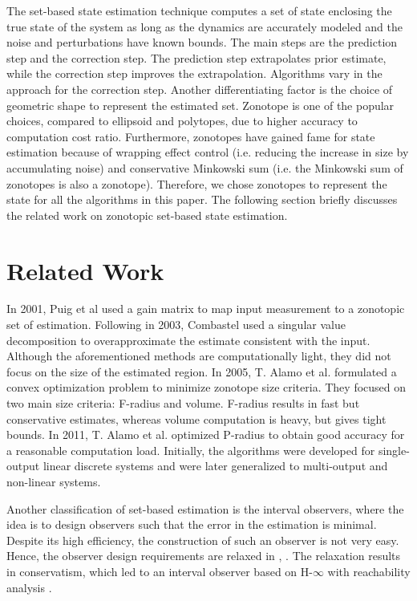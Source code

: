 The set-based state estimation technique computes a set of state enclosing the true state of the system as long as the dynamics are accurately modeled and the noise and perturbations have known bounds. The main steps are the prediction step and the correction step. The prediction step extrapolates prior estimate, while the correction step improves the extrapolation. Algorithms vary in the approach for the correction step. Another differentiating factor is the choice of geometric shape to represent the estimated set. Zonotope is one of the popular choices, compared to ellipsoid and polytopes, due to higher accuracy to computation cost ratio. Furthermore, zonotopes have gained fame for state estimation because of wrapping effect control (i.e. reducing the increase in size by accumulating noise) and conservative Minkowski sum (i.e. the Minkowski sum of zonotopes is also a zonotope). Therefore, we chose zonotopes to represent the state for all the algorithms in this paper. The following section briefly discusses the related work on zonotopic set-based state estimation.


\section{Related Work}
In 2001, Puig et al \cite{Puig2001} used a gain matrix to map input measurement to a zonotopic set of estimation. Following in 2003, Combastel \cite{Combastel2003} used a singular value decomposition to overapproximate the estimate consistent with the input. Although the aforementioned methods are computationally light, they did not focus on the size of the estimated region. In 2005, T. Alamo et al. \cite{Alamo2005} formulated a convex optimization problem to minimize zonotope size criteria. They focused on two main size criteria: F-radius and volume. F-radius results in fast but conservative estimates, whereas volume computation is heavy, but gives tight bounds. In 2011, T. Alamo et al. \cite{Le2012} optimized P-radius to obtain good accuracy for a reasonable computation load. Initially, the algorithms were developed for single-output linear discrete systems and were later generalized to multi-output and non-linear systems.  

Another classification of set-based estimation is the interval observers, where the idea is to design observers such that the error in the estimation is minimal. Despite its high efficiency, the construction of such an observer is not very easy. Hence, the observer design requirements are relaxed in  \cite{Mazenc2011}, \cite{Raissi2012}. The relaxation results in conservatism, which led to an interval observer based on H-$\infty$ with reachability analysis \cite{Tang2019}.

